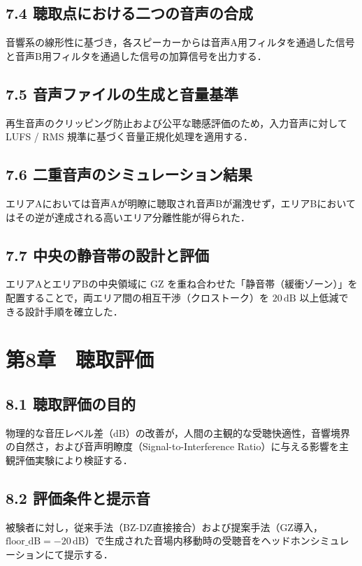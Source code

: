 \documentclass[11pt, a4paper]{article}
\begin{document}
\subsection{7.4 聴取点における二つの音声の合成}
音響系の線形性に基づき，各スピーカーからは音声A用フィルタを通過した信号と音声B用フィルタを通過した信号の加算信号を出力する．

\subsection{7.5 音声ファイルの生成と音量基準}
再生音声のクリッピング防止および公平な聴感評価のため，入力音声に対して LUFS / RMS 規準に基づく音量正規化処理を適用する．

\subsection{7.6 二重音声のシミュレーション結果}
エリアAにおいては音声Aが明瞭に聴取され音声Bが漏洩せず，エリアBにおいてはその逆が達成される高いエリア分離性能が得られた．

\subsection{7.7 中央の静音帯の設計と評価}
エリアAとエリアBの中央領域に GZ を重ね合わせた「静音帯（緩衝ゾーン）」を配置することで，両エリア間の相互干渉（クロストーク）を $20\,\mathrm{dB}$ 以上低減できる設計手順を確立した．

\section{第8章　聴取評価}

\subsection{8.1 聴取評価の目的}
物理的な音圧レベル差（$\mathrm{dB}$）の改善が，人間の主観的な受聴快適性，音響境界の自然さ，および音声明瞭度（Signal-to-Interference Ratio）に与える影響を主観評価実験により検証する．

\subsection{8.2 評価条件と提示音}
被験者に対し，従来手法（BZ-DZ直接接合）および提案手法（GZ導入，$\mathrm{floor\_dB} = -20\,\mathrm{dB}$）で生成された音場内移動時の受聴音をヘッドホンシミュレーションにて提示する．
\end{document}
